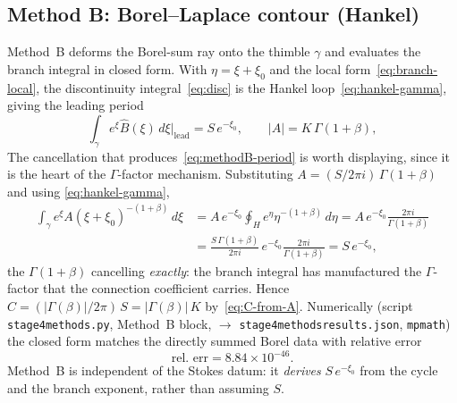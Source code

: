 \documentclass[11pt,reqno]{amsart}
\renewcommand{\_}{\vquadorigunderscore\allowbreak}
\theoremstyle{plain}
\theoremstyle{definition}
\newcommand{\Bhat}{\widehat{B}}
\newcommand{\xizero}{\xi_0}
\providecommand{\C}{}\renewcommand{\C}{C}
\begin{document}
\subsection{Method B: Borel--Laplace contour (Hankel)}\label{sub:methodB}
Method~B deforms the Borel-sum ray onto the thimble $\gamma$ and evaluates the branch integral in
closed form. With $\eta=\xi+\xizero$ and the local form~\eqref{eq:branch-local}, the
discontinuity integral~\eqref{eq:disc} is the Hankel loop~\eqref{eq:hankel-gamma}, giving the
leading period
\begin{equation}\label{eq:methodB-period}
  \int_\gamma e^{\xi}\Bhat(\xi)\,d\xi\Big|_{\text{lead}}=S\,e^{-\xizero},\qquad
  \lvert A\rvert=K\,\Gamma(1+\beta),
\end{equation}
The cancellation that produces~\eqref{eq:methodB-period} is worth displaying, since it is the heart
of the $\Gamma$-factor mechanism. Substituting $A=(S/2\pi i)\,\Gamma(1+\beta)$ and using
\eqref{eq:hankel-gamma},
\begin{equation}\label{eq:methodB-chain}
\begin{split}
  \int_\gamma e^{\xi}A(\xi+\xizero)^{-(1+\beta)}\,d\xi
  &=A\,e^{-\xizero}\!\oint_{H}e^{\eta}\eta^{-(1+\beta)}\,d\eta
  =A\,e^{-\xizero}\frac{2\pi i}{\Gamma(1+\beta)}\\
  &=\frac{S\,\Gamma(1+\beta)}{2\pi i}\,e^{-\xizero}\frac{2\pi i}{\Gamma(1+\beta)}
  =S\,e^{-\xizero},
\end{split}
\end{equation}
the $\Gamma(1+\beta)$ cancelling \emph{exactly}: the branch integral has manufactured the
$\Gamma$-factor that the connection coefficient carries. Hence
$\C=(\lvert\Gamma(\beta)\rvert/2\pi)\,S=\lvert\Gamma(\beta)\rvert\,K$
by~\eqref{eq:C-from-A}. Numerically (script \texttt{stage4\_methods.py}, Method~B block,
$\to$ \texttt{stage4\_methods\_results.json}, \texttt{mpmath}) the closed form
matches the directly summed Borel data with relative error
\begin{equation}\label{eq:methodB-err}
  \text{rel.\ err}=8.84\times10^{-46}.
\end{equation}
Method~B is independent of the Stokes datum: it \emph{derives} $S\,e^{-\xizero}$ from the cycle and
the branch exponent, rather than assuming $S$.
\end{document}
